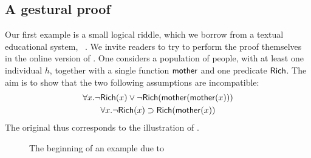 
\subsection{A gestural proof}

\AP
Our first example is a small logical riddle, which we borrow from a textual
educational system, ~. We invite readers to try
to perform the proof themselves in the online version of
. One
considers a population of people, with at least one individual $h$, together
with a single function $\mbox{\textsf{mother}}$ and one predicate $\mbox{\textsf{Rich}}$. The aim is to show
that the two following assumptions are incompatible:
\begin{gather}
  \forall x. \neg\mbox{\textsf{Rich}}(x)\lor \neg\mbox{\textsf{Rich}}(\mbox{\textsf{mother}}(\mbox{\textsf{mother}}(x))) \label{hyp:1} \\
  \forall x. \neg\mbox{\textsf{Rich}}(x) \supset \mbox{\textsf{Rich}}(\mbox{\textsf{mother}}(x)) \label{hyp:2}
\end{gather}
The original  thus corresponds to the illustration of .

\begin{figure*}
  \caption{The beginning of an example due to }
\end{figure*}

